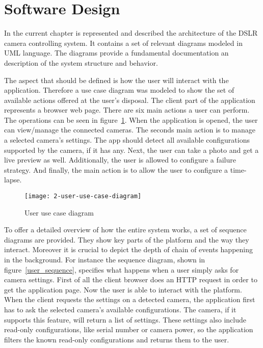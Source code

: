\section{Software Design}

In the current chapter is represented and described the architecture of the DSLR camera controlling system. It contains a set of relevant diagrams modeled in UML language. The diagrams provide a fundamental documentation an description of the system structure and behavior.

The aspect that should be defined is how the user will interact with the application. Therefore a use case diagram was modeled to show the set of available actions offered at the user's disposal. The client part of the application represents a browser web page. There are six main actions a user can perform. The operations can be seen in \mbox{figure \ref{use_case}}. When the application is opened, the user can view/manage the connected cameras. The seconds main action is to manage a selected camera's settings. The app should detect all available configurations supported by the camera, if it has any. Next, the user can take a photo and get a live preview as well. Additionally, the user is allowed to configure a failure strategy. And finally, the main action is to allow the user to configure a time-lapse.

\begin{figure}[!ht]
\centering
\texttt{[image: 2-user-use-case-diagram]}
\caption{User use case diagram}\label{use_case}
\end{figure}

To offer a detailed overview of how the entire system works, a set of sequence diagrams are provided. They show key parts of the platform and the way they interact. Moreover it is crucial to depict the depth of chain of events happening in the background. For instance the sequence diagram, shown in \mbox{figure \ref{user_sequence}}, specifies what happens when a user simply asks for camera settings. First of all the client browser does an HTTP request in order to get the application page. Now the user is able to interact with the platform. When the client requests the settings on a detected camera, the application first has to ask the selected camera's available configurations. The camera, if it supports this feature, will return a list of settings. These settings also include read-only configurations, like serial number or camera power, so the application filters the known read-only configurations and returns them to the user.

